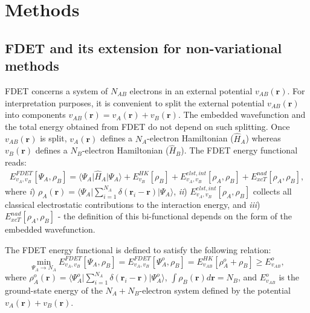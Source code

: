 \documentclass[journal=jctcce,manuscript=article]{achemso}
\begin{document}
\section{Methods}
\subsection{FDET and its extension for non-variational methods}
FDET concerns a system of $N_{AB}$ electrons in an external potential  $v_{AB}(\mathbf{r})$.
For interpretation purposes, it is convenient to split the external potential $v_{AB}(\mathbf{r})$ into components $v_{AB}(\mathbf{r})=v_{A}(\mathbf{r})+v_{B}(\mathbf{r})$. 
The  embedded wavefunction and the total energy obtained from FDET do not depend on such splitting. 
Once $v_{AB}(\mathbf{r})$  is split, $v_{A}(\mathbf{r})$ defines a $N_A$-electron Hamiltonian ($\hat{H}_A$) whereas 
$v_{B}(\mathbf{r})$ defines a $N_B$-electron Hamiltonian ($\hat{H}_B$). 
The  FDET energy functional reads: 
\begin{eqnarray} 
\label{eq:E_FDET_v'}
{E}_{v_A,v_B}^{FDET}[\Psi_{A},\rho_B] = \langle\Psi_{A}\vert \hat{H}_A\vert \Psi_{A}\rangle + E^{HK}_{v_B}[\rho_B] + E^{elst,int}_{v_A,v_B}[\rho_A,\rho_B] + E_{xcT}^{nad}[\rho_A,\rho_B], 
\end{eqnarray}
where {\it i}) $\rho_A(\mathbf{r})=\langle\Psi_A\vert\sum_{i=1}^{N_{A}}\delta(\mathbf{r}_i-\mathbf{r})\vert\Psi_A\rangle$,
{\it ii}) $E^{elst,int}_{v_A,v_B}[\rho_A,\rho_B]$ collects  all classical electrostatic contributions to the interaction energy, and 
{\it iii}) $E_{xcT}^{nad}[\rho_A,\rho_B]$ - the definition of this bi-functional depends on the form of the embedded wavefunction\cite{Wesolowski2008}.


The FDET energy functional is defined to satisfy the following relation:
\begin{equation}\label{eq:nfund}
\min_{\Psi_A\rightarrow N_A} E_{v_{A},{v_B}}^{FDET}[\Psi_{A},\rho_B] = E_{v_{A},{v_B}}^{FDET}[\Psi^{o}_{A},\rho_B]  = E_{v_{AB}}^{HK}[\rho_A^{o}+\rho_B] \ge E_{v_{AB}}^o,
\end{equation}
where $\rho_A^{{o}}(\mathbf{r})=\langle\Psi_A^{{o}}\vert\sum_{i=1}^{N_{A}}\delta(\mathbf{r}_i-\mathbf{r})\vert\Psi_A^{{o}}\rangle$, $\int\rho_B(\mathbf{r})d\mathbf{r}=N_B$, and $E_{v_{AB}}^o$ is the ground-state energy of the $N_A+N_B$-electron system defined by the potential  $v_{A}(\mathbf{r})+v_{B}(\mathbf{r})$.
\end{document}
